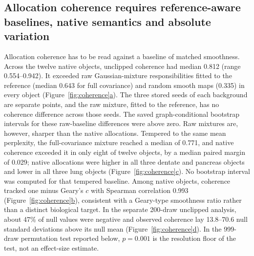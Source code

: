 \documentclass[11pt]{article}
\newcommand{\figpanel}[2]{Figure~\hyperref[#1]{\ref*{#1}#2}}
\begin{document}
\subsection{Allocation coherence requires reference-aware baselines, native semantics and absolute variation}

Allocation coherence has to be read against a baseline of matched smoothness. Across the twelve native objects, unclipped coherence had median 0.812 (range 0.554--0.942). It exceeded raw Gaussian-mixture responsibilities fitted to the reference (median 0.643 for full covariance) and random smooth maps (0.335) in every object (\figpanel{fig:coherence}{a}). The three stored seeds of each background are separate points, and the raw mixture, fitted to the reference, has no coherence difference across those seeds. The saved graph-conditional bootstrap intervals for these raw-baseline differences were above zero. Raw mixtures are, however, sharper than the native allocations. Tempered to the same mean perplexity, the full-covariance mixture reached a median of 0.771, and native coherence exceeded it in only eight of twelve objects, by a median paired margin of 0.029; native allocations were higher in all three dentate and pancreas objects and lower in all three lung objects (\figpanel{fig:coherence}{c}). No bootstrap interval was computed for that tempered baseline. Among native objects, coherence tracked one minus Geary's $c$ with Spearman correlation 0.993 (\figpanel{fig:coherence}{b}), consistent with a Geary-type smoothness ratio rather than a distinct biological target. In the separate 200-draw unclipped analysis, about 47\% of null values were negative and observed coherence lay 13.8--70.6 null standard deviations above its null mean (\figpanel{fig:coherence}{d}). In the 999-draw permutation test reported below, $p=0.001$ is the resolution floor of the test, not an effect-size estimate.
\end{document}
